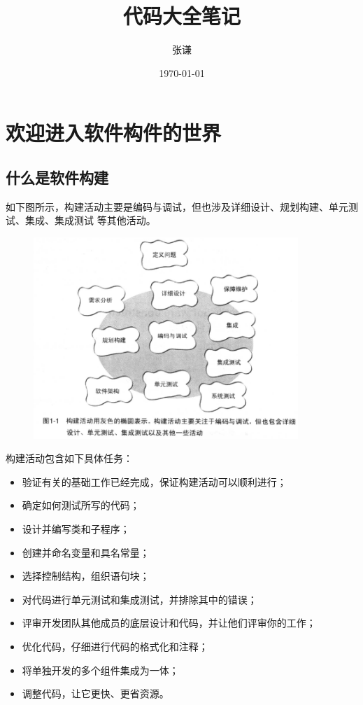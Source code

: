 \documentclass{article}
\title{代码大全笔记}
\author{张谦}
\date{\today}
\begin{document}
\maketitle
\tableofcontents
\newpage

\section{欢迎进入软件构件的世界}
\subsection{什么是软件构建}
如下图所示，构建活动主要是编码与调试，但也涉及详细设计、规划构建、单元测试、集成、集成测试
等其他活动。
\begin{figure}[ht]
    \centering
    \includegraphics[width=10cm]{figure1.png}
\end{figure}

\par
构建活动包含如下具体任务：
\begin{itemize}
    \item 验证有关的基础工作已经完成，保证构建活动可以顺利进行；
    \item 确定如何测试所写的代码；
    \item 设计并编写类和子程序；
    \item 创建并命名变量和具名常量；
    \item 选择控制结构，组织语句块；
    \item 对代码进行单元测试和集成测试，并排除其中的错误；
    \item 评审开发团队其他成员的底层设计和代码，并让他们评审你的工作；
    \item 优化代码，仔细进行代码的格式化和注释；
    \item 将单独开发的多个组件集成为一体；
    \item 调整代码，让它更快、更省资源。
\end{itemize}
\end{document}
